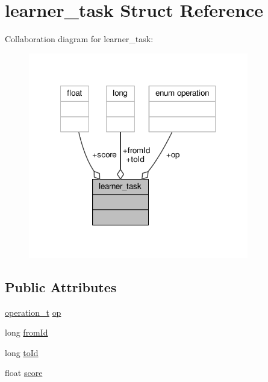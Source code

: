 \hypertarget{structlearner__task}{\section{learner\-\_\-task Struct Reference}
\label{structlearner__task}
}


Collaboration diagram for learner\-\_\-task\-:
\nopagebreak
\begin{figure}[H]
\begin{center}
\leavevmode
\includegraphics[width=272pt]{structlearner__task__coll__graph}
\end{center}
\end{figure}
\subsection*{Public Attributes}
\begin{DoxyCompactItemize}
\item 
\hyperlink{bayes_2operation_8h_aa0a2186e2195264ce2bc21107ca829da}{operation\-\_\-t} \hyperlink{structlearner__task_a53d37a6e20de1fde3605548b2047fffb}{op}
\item 
long \hyperlink{structlearner__task_a03ce8c719f9853b0324d861b28eea9e8}{from\-Id}
\item 
long \hyperlink{structlearner__task_a1886290311045ff06b0b6fef325d722a}{to\-Id}
\item 
float \hyperlink{structlearner__task_a27432e7e0f6675a9b11146245817d70a}{score}
\end{DoxyCompactItemize}


